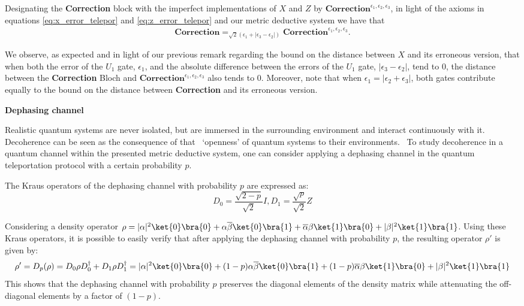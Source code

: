 \begin{example}
    Designating the \textbf{Correction} block with the imperfect implementations of $X$ and $Z$ by $\textbf{Correction}^{\epsilon_1, \epsilon_2, \epsilon_3}$, in light of the axioms in equations \eqref{eq:x_error_telepor} and \eqref{eq:z_error_telepor} and our metric deductive system we have that
    \begin{align} \label{eq:z_error_telepor}
      \textbf{Correction} =_{\sqrt{2} \left(\epsilon_1 +|\epsilon_3-\epsilon_2| \right)} \textbf{Correction}^{\epsilon_1, \epsilon_2, \epsilon_3}.
    \end{align}


    We observe, as expected and in light of our previous remark regarding the bound on the distance between $X$ and its erroneous version, that when both the error of the $U_1$ gate, $\epsilon_1$, and the absolute difference between the errors of the $U_1$ gate, $|\epsilon_3 - \epsilon_2|$, tend to $0$, the distance between the \textbf{Correction} Bloch and $\textbf{Correction}^{\epsilon_1, \epsilon_2, \epsilon_3}$ also tends to $0$. 
    Moreover, note that when $\epsilon_1 = |\epsilon_2 + \epsilon_3|$, both gates contribute equally to the bound on the distance between \textbf{Correction} and its erroneous version.

    \vspace{5pt}

     \textbf{Dephasing channel}

     Realistic quantum systems are never isolated, but are immersed in the surrounding environment and interact continuously with it. Decoherence can be seen as the consequence of that  `openness' of quantum systems to their environments.  To study decoherence in a quantum channel within the presented metric deductive system, one can consider applying a dephasing channel in the quantum teleportation protocol with a certain probability $p$.

     The Kraus operators of the dephasing channel with probability $p$ are expressed as:
     \begin{equation*}
          D_{0}= \frac{\sqrt{2-p}}{\sqrt{2}} I,  D_{1}= \frac{\sqrt{p}}{\sqrt{2}} Z
     \end{equation*}
     
     Considering a density operator $\rho=|\alpha|^{2} \ket{0} \bra{0} + \alpha \overline{\beta} \ket{0} \bra{1}+ \overline{\alpha} \beta \ket{1} \bra{0} + |\beta|^{2} \ket{1} \bra{1}$. Using these Kraus operators, it is possible to easily verify  that after applying the dephasing channel with probability $p$, the resulting operator $\rho'$ is given by: 
     \begin{equation*} 
          \rho' = D_p(\rho)= D_{0} \rho D_{0}^{\dag} + D_{1} \rho D_{1}^{\dag} = |\alpha|^{2} \ket{0} \bra{0} +  (1-p) \alpha \overline{\beta} \ket{0} \bra{1}+  (1-p) \overline{\alpha}  \beta \ket{1} \bra{0} + |\beta|^{2} \ket{1} \bra{1}
     \end{equation*}
     This shows that the dephasing channel with probability $p$ preserves the diagonal elements of the density matrix while attenuating the off-diagonal elements by a factor of $(1-p)$.


\end{example}
